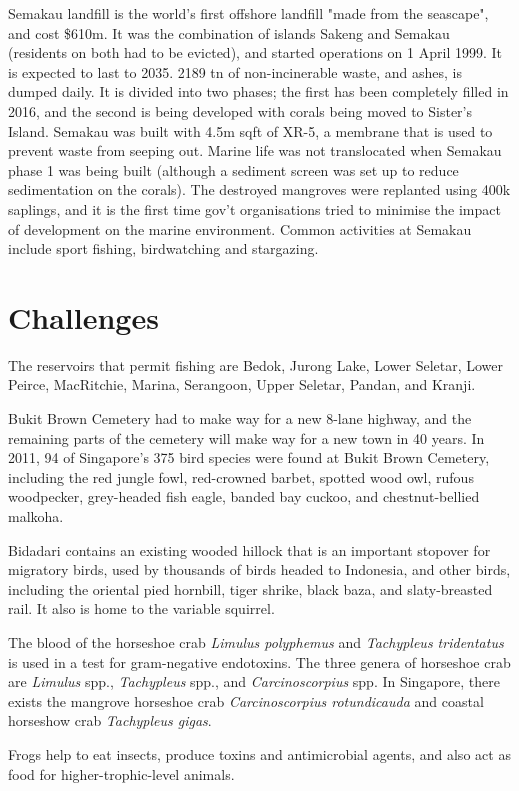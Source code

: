 \documentclass{slnotes}
\newcommand{\scn}[1]{\textit{#1}}
\begin{document}
Semakau landfill is the world's first offshore landfill "made from the seascape", and cost \$610m. It was the combination of islands Sakeng and Semakau (residents on both had to be evicted), and started operations on 1 April 1999. It is expected to last to 2035. 2189 tn of non-incinerable waste, and ashes, is dumped daily. It is divided into two phases; the first has been completely filled in 2016, and the second is being developed with corals being moved to Sister's Island. Semakau was built with 4.5m sqft of XR-5, a membrane that is used to prevent waste from seeping out. Marine life was not translocated when Semakau phase 1 was being built (although a sediment screen was set up to reduce sedimentation on the corals). The destroyed mangroves were replanted using 400k saplings, and it is the first time gov't organisations tried to minimise the impact of development on the marine environment. Common activities at Semakau include sport fishing, birdwatching and stargazing.
\chapter{Challenges}
The reservoirs that permit fishing are Bedok, Jurong Lake, Lower Seletar, Lower Peirce, MacRitchie, Marina, Serangoon, Upper Seletar, Pandan, and Kranji.

Bukit Brown Cemetery had to make way for a new 8-lane highway, and the remaining parts of the cemetery will make way for a new town in 40 years. In 2011, 94 of Singapore's 375 bird species were found at Bukit Brown Cemetery, including the red jungle fowl, red-crowned barbet, spotted wood owl, rufous woodpecker, grey-headed fish eagle, banded bay cuckoo, and chestnut-bellied malkoha.

Bidadari contains an existing wooded hillock that is an important stopover for migratory birds, used by thousands of birds headed to Indonesia, and other birds, including the oriental pied hornbill, tiger shrike, black baza, and slaty-breasted rail. It also is home to the variable squirrel.

The blood of the horseshoe crab \scn{Limulus polyphemus} and \scn{Tachypleus tridentatus} is used in a test for gram-negative endotoxins. The three genera of horseshoe crab are \scn{Limulus} spp., \scn{Tachypleus} spp., and \scn{Carcinoscorpius} spp. In Singapore, there exists the mangrove horseshoe crab \scn{Carcinoscorpius rotundicauda} and coastal horseshow crab \scn{Tachypleus gigas}.

Frogs help to eat insects, produce toxins and antimicrobial agents, and also act as food for higher-trophic-level animals.
\end{document}
